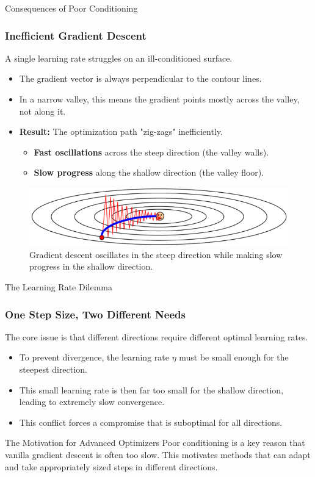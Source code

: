 \begin{frame}{Consequences of Poor Conditioning}
    \frametitle{Inefficient Gradient Descent}
    A single learning rate struggles on an ill-conditioned surface.
    \begin{itemize}
        \item The gradient vector is always perpendicular to the contour lines.
        \item In a narrow valley, this means the gradient points mostly across the valley, not along it.
        \item \textbf{Result:} The optimization path "zig-zags" inefficiently.
        \begin{itemize}
            \item \textbf{Fast oscillations} across the steep direction (the valley walls).
            \item \textbf{Slow progress} along the shallow direction (the valley floor).
        \end{itemize}
    \end{itemize}
    \begin{figure}
        \includegraphics[width=1\textwidth]{images/zigzag.png}
        \caption{Gradient descent oscillates in the steep direction while making slow progress in the shallow direction.}
    \end{figure}
\end{frame}

\begin{frame}{The Learning Rate Dilemma}
    \frametitle{One Step Size, Two Different Needs}
    The core issue is that different directions require different optimal learning rates.
    \begin{itemize}
        \item To prevent divergence, the learning rate $\eta$ must be small enough for the steepest direction.
        \item This small learning rate is then far too small for the shallow direction, leading to extremely slow convergence.
        \item This conflict forces a compromise that is suboptimal for all directions.
    \end{itemize}
    \begin{alertblock}{The Motivation for Advanced Optimizers}
        Poor conditioning is a key reason that vanilla gradient descent is often too slow. This motivates methods that can adapt and take appropriately sized steps in different directions.
    \end{alertblock}
\end{frame}

